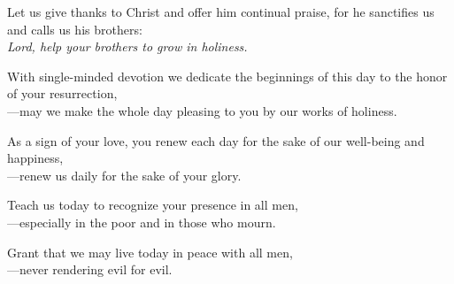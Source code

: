 \intercessions

\begin{raggedright}
Let us give thanks to Christ and offer him continual praise, for he sanctifies us and calls us his brothers:\\
\emph{Lord, help your brothers to grow in holiness.}

\medskip
With single-minded devotion we dedicate the beginnings of this day to the honor of your resurrection,\\
{\color{red}---}may we make the whole day pleasing to you by our works of holiness.

\medskip
As a sign of your love, you renew each day for the sake of our well-being and happiness,\\
{\color{red}---}renew us daily for the sake of your glory.

\medskip
Teach us today to recognize your presence in all men,\\
{\color{red}---}especially in the poor and in those who mourn.

\medskip
Grant that we may live today in peace with all men,\\
{\color{red}---}never rendering evil for evil.
\end{raggedright}